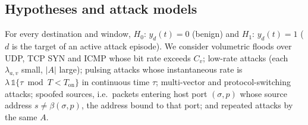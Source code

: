 \documentclass[conference]{IEEEtran}
\begin{document}
\subsection{Hypotheses and attack models}
For every destination and window, $H_0$: $y_d(t)=0$ (benign) and $H_1$: $y_d(t)=1$ ($d$ is the target of an active attack episode). We consider volumetric floods over UDP, TCP SYN and ICMP whose bit rate exceeds $C_v$; low-rate attacks (each $\lambda_{a,v}$ small, $|A|$ large); pulsing attacks whose instantaneous rate is $\lambda\,\mathbb{1}\{\tau \bmod T<T_{\text{on}}\}$ in continuous time $\tau$; multi-vector and protocol-switching attacks; spoofed sources, i.e.\ packets entering host port $(\sigma,p)$ whose source address $s\neq\beta(\sigma,p)$, the address bound to that port; and repeated attacks by the same $A$.
\end{document}
